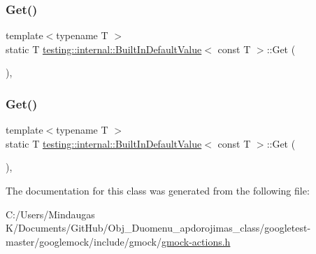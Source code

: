 \subsubsection{\texorpdfstring{Get()}{Get()}\hspace{0.1cm}{\footnotesize\ttfamily [2/3]}}
{\footnotesize\ttfamily template$<$typename T $>$ \\
static T \mbox{\hyperlink{classtesting_1_1internal_1_1_built_in_default_value}{testing\+::internal\+::\+Built\+In\+Default\+Value}}$<$ const T $>$\+::Get (\begin{DoxyParamCaption}{ }\end{DoxyParamCaption})\hspace{0.3cm}{\ttfamily [inline]}, {\ttfamily [static]}}

\mbox{\label{classtesting_1_1internal_1_1_built_in_default_value_3_01const_01_t_01_4_a5996754952ecbcc5da77a2cebd4722de}} 
\subsubsection{\texorpdfstring{Get()}{Get()}\hspace{0.1cm}{\footnotesize\ttfamily [3/3]}}
{\footnotesize\ttfamily template$<$typename T $>$ \\
static T \mbox{\hyperlink{classtesting_1_1internal_1_1_built_in_default_value}{testing\+::internal\+::\+Built\+In\+Default\+Value}}$<$ const T $>$\+::Get (\begin{DoxyParamCaption}{ }\end{DoxyParamCaption})\hspace{0.3cm}{\ttfamily [inline]}, {\ttfamily [static]}}



The documentation for this class was generated from the following file\+:\begin{DoxyCompactItemize}
\item 
C\+:/\+Users/\+Mindaugas K/\+Documents/\+Git\+Hub/\+Obj\+\_\+\+Duomenu\+\_\+apdorojimas\+\_\+class/googletest-\/master/googlemock/include/gmock/\mbox{\hyperlink{googletest-master_2googlemock_2include_2gmock_2gmock-actions_8h}{gmock-\/actions.\+h}}\end{DoxyCompactItemize}
